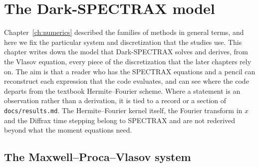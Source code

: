 \chapter{The Dark-SPECTRAX model}\label{ch:model}

Chapter~\ref{ch:numerics} described the families of methods in general terms, and here we fix the particular system and discretization that the studies use. This chapter writes down the model that Dark-SPECTRAX solves and derives, from the Vlasov equation, every piece of the discretization that the later chapters rely on. The aim is that a reader who has the SPECTRAX equations and a pencil can reconstruct each expression that the code evaluates, and can see where the code departs from the textbook Hermite--Fourier scheme. Where a statement is an observation rather than a derivation, it is tied to a record or a section of \texttt{docs/results.md}. The Hermite--Fourier kernel itself, the Fourier transform in $x$ and the Diffrax time stepping belong to SPECTRAX and are not rederived beyond what the moment equations need.

\section{The Maxwell--Proca--Vlasov system}\label{sec:mpv}

